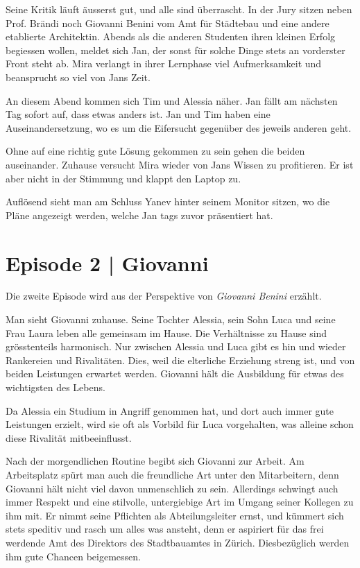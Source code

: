 \documentclass[11pt,a4paper,ngerman]{scrreprt}
\begin{document}
Seine Kritik läuft äusserst gut, und alle sind überrascht. In der Jury sitzen
neben Prof. Brändi noch Giovanni Benini vom Amt für Städtebau und eine andere
etablierte Architektin. Abends als die anderen Studenten ihren kleinen Erfolg
begiessen wollen, meldet sich Jan, der sonst für solche Dinge stets an
vorderster Front steht ab. Mira verlangt in ihrer Lernphase viel Aufmerksamkeit
und beansprucht so viel von Jans Zeit.

An diesem Abend kommen sich Tim und Alessia näher. Jan fällt am nächsten Tag
sofort auf, dass etwas anders ist. Jan und Tim haben eine Auseinandersetzung, wo
es um die Eifersucht gegenüber des jeweils anderen geht.

Ohne auf eine richtig gute Lösung gekommen zu sein gehen die beiden
auseinander. Zuhause versucht Mira wieder von Jans Wissen zu profitieren. Er ist
aber nicht in der Stimmung und klappt den Laptop zu.

Auflösend sieht man am Schluss Yanev hinter seinem Monitor sitzen, wo die Pläne
angezeigt werden, welche Jan tags zuvor präsentiert hat.

\section*{Episode 2 | Giovanni}

Die zweite Episode wird aus der Perspektive von \emph{Giovanni Benini} erzählt.

Man sieht Giovanni zuhause. Seine Tochter Alessia, sein Sohn Luca und seine Frau
Laura leben alle gemeinsam im Hause. Die Verhältnisse zu Hause sind
grösstenteils harmonisch. Nur zwischen Alessia und Luca gibt es hin und wieder
Rankereien und Rivalitäten. Dies, weil die elterliche Erziehung streng ist, und
von beiden Leistungen erwartet werden. Giovanni hält die Ausbildung für etwas
des wichtigsten des Lebens.

Da Alessia ein Studium in Angriff genommen hat, und dort auch immer gute
Leistungen erzielt, wird sie oft als Vorbild für Luca vorgehalten, was alleine
schon diese Rivalität mitbeeinflusst.

Nach der morgendlichen Routine begibt sich Giovanni zur Arbeit. Am Arbeitsplatz
spürt man auch die freundliche Art unter den Mitarbeitern, denn Giovanni hält
nicht viel davon unmenschlich zu sein. Allerdings schwingt auch immer Respekt
und eine stilvolle, untergiebige Art im Umgang seiner Kollegen zu ihm mit. Er
nimmt seine Pflichten als Abteilungsleiter ernst, und kümmert sich stets
speditiv und rasch um alles was ansteht, denn er aspiriert für das frei werdende
Amt des Direktors des Stadtbauamtes in Zürich. Diesbezüglich werden ihm gute
Chancen beigemessen.
\end{document}
